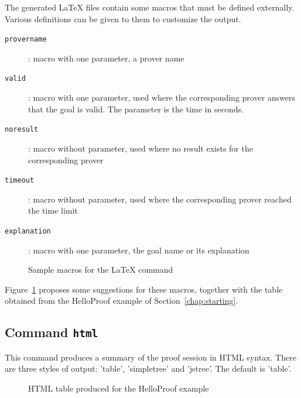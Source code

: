 The generated LaTeX files contain some macros that must be defined
externally.  Various definitions can be given to them to customize the
output.
\begin{description}
\item[\texttt{\bs{}provername}]: macro with one parameter, a prover name
\item[\texttt{\bs{}valid}]: macro with one parameter, used where the corresponding prover answers that the goal is valid. The parameter is the time in seconds.
\item[\texttt{\bs{}noresult}]: macro without parameter, used where no result
  exists for the corresponding prover
\item[\texttt{\bs{}timeout}]: macro without parameter, used where the corresponding prover reached the time limit
\item[\texttt{\bs{}explanation}]: macro with one parameter, the goal name or its explanation
\end{description}

\begin{figure}[t]
  \begin{center}
    
  \end{center}
  
  \caption{Sample macros for the LaTeX command}
\label{fig:latex}
\end{figure}

Figure~\ref{fig:latex} proposes some suggestions for these macros,
together with the table obtained from the HelloProof example of
Section~\ref{chap:starting}.

\subsection{Command \texttt{html}}

This command produces a summary of the proof session in HTML syntax.
There are three styles of output: 'table', 'simpletree' and
'jstree'. The default is 'table'.

\begin{figure}[t]
  \begin{center}
  \end{center}
  \caption{HTML table produced for the HelloProof example}
\label{fig:html}
\end{figure}

